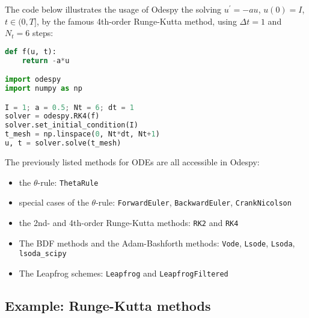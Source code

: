 \documentclass[graybox,sectrefs,envcountresetchap,open=right,final]{svmonodo}
\begin{document}
The code below illustrates the usage of Odespy the solving $u^{\prime}=-au$,
$u(0)=I$, $t\in (0,T]$,
by the famous 4th-order Runge-Kutta method, using $\Delta t=1$
and $N_t=6$ steps:













\begin{lstlisting}[language=python,style=blue1bar_bluegreen]
def f(u, t):
    return -a*u

import odespy
import numpy as np

I = 1; a = 0.5; Nt = 6; dt = 1
solver = odespy.RK4(f)
solver.set_initial_condition(I)
t_mesh = np.linspace(0, Nt*dt, Nt+1)
u, t = solver.solve(t_mesh)

\end{lstlisting}


The previously listed methods for ODEs are all accessible in
Odespy:

\begin{itemize}
 \item the $\theta$-rule: \texttt{ThetaRule}

 \item special cases of the $\theta$-rule: \texttt{ForwardEuler}, \texttt{BackwardEuler}, \texttt{CrankNicolson}

 \item the 2nd- and 4th-order Runge-Kutta methods: \texttt{RK2} and \texttt{RK4}

 \item The BDF methods and the Adam-Bashforth methods: \texttt{Vode}, \texttt{Lsode}, \texttt{Lsoda}, \Verb!lsoda_scipy!

 \item The Leapfrog schemes: \texttt{Leapfrog} and \texttt{LeapfrogFiltered}
\end{itemize}

\noindent
\subsection{Example: Runge-Kutta methods}
\end{document}
